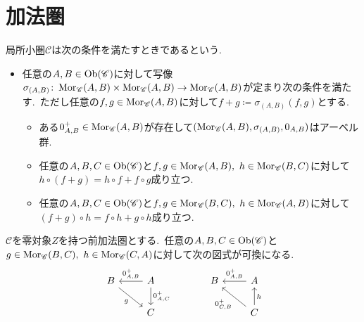 
\section{加法圏}

\begin{definition} \label{def: IsPreadditive}
局所小圏$\mathscr{C}$は次の条件を満たすときであるという.
\begin{itemize}
    \item 任意の$A, B \in \operatorname{Ob}(\mathscr{C})$に対して写像$\sigma_{(A,B)} \colon \operatorname{Mor}_{\mathscr{C}}(A, B) \times \operatorname{Mor}_{\mathscr{C}}(A, B) \to \operatorname{Mor}_{\mathscr{C}}(A, B)$が定まり次の条件を満たす.\
    ただし任意の$f, g \in \operatorname{Mor}_{\mathscr{C}}(A, B)$に対して$f + g \coloneq \sigma_{(A,B)}(f,g)$とする.
    \begin{itemize}
    \item ある$0_{A,B}^{+} \in \operatorname{Mor}_{\mathscr{C}}(A,B)$が存在して$(\operatorname{Mor}_{\mathscr{C}}(A,B), \sigma_{(A,B)}, 0_{A,B} )$はアーベル群.
    \item 任意の$A, B, C \in \operatorname{Ob}(\mathscr{C})$と$f,g \in \operatorname{Mor}_{\mathscr{C}}(A, B),\ h \in \operatorname{Mor}_{\mathscr{C}}(B, C)$に対して$h \circ (f + g) = h \circ f + f \circ g$成り立つ.
    \item 任意の$A, B, C \in \operatorname{Ob}(\mathscr{C})$と$f,g \in \operatorname{Mor}_{\mathscr{C}}(B, C),\ h \in \operatorname{Mor}_{\mathscr{C}}(A, B)$に対して$(f + g) \circ h = f \circ h + g \circ h$成り立つ.
    \end{itemize}
\end{itemize}
\end{definition}

\begin{lemma} \label{lem: additive_zero_comp}
$\mathscr{C}$を零対象$Z$を持つ前加法圏とする.\
任意の$A, B, C \in \operatorname{Ob}(\mathscr{C})$と$g \in \operatorname{Mor}_{\mathscr{C}}(B, C),\ h \in \operatorname{Mor}_{\mathscr{C}}(C, A)$に対して次の図式が可換になる.
\[\begin{tikzcd}
	B & A && B & A \\
	& C &&& C
	\arrow["g"', from=1-1, to=2-2]
	\arrow["{0_{A,B}^{+}}"', from=1-2, to=1-1]
	\arrow["{0_{A,C}^{+}}", from=1-2, to=2-2]
	\arrow["{0_{A, B}^{+}}"', from=1-5, to=1-4]
	\arrow["{0_{C,B}^{+}}", from=2-5, to=1-4]
	\arrow["h"', from=2-5, to=1-5]
\end{tikzcd}\]
\end{lemma}

